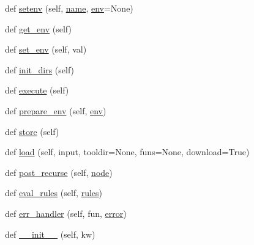 \begin{DoxyCompactItemize}
\item 
def \hyperlink{classwaflib_1_1_configure_1_1_configuration_context_a2ed4960105cdf08c13cd178367ae1818}{setenv} (self, \hyperlink{lib_2expat_8h_a1b49b495b59f9e73205b69ad1a2965b0}{name}, \hyperlink{classwaflib_1_1_configure_1_1_configuration_context_a390267f6d3529fe07447ffb4925ca533}{env}=None)
\item 
def \hyperlink{classwaflib_1_1_configure_1_1_configuration_context_a5f2dfad34690147826b09413246140f7}{get\+\_\+env} (self)
\item 
def \hyperlink{classwaflib_1_1_configure_1_1_configuration_context_ad30b269279dd9c24e6d892bb3b2fc583}{set\+\_\+env} (self, val)
\item 
def \hyperlink{classwaflib_1_1_configure_1_1_configuration_context_a782925b68e221c10f8e08433329364c9}{init\+\_\+dirs} (self)
\item 
def \hyperlink{classwaflib_1_1_configure_1_1_configuration_context_a2dadcc441cc31bb49159c709bae0ec32}{execute} (self)
\item 
def \hyperlink{classwaflib_1_1_configure_1_1_configuration_context_a913063288a6135c3105acf180e7f0f0c}{prepare\+\_\+env} (self, \hyperlink{classwaflib_1_1_configure_1_1_configuration_context_a390267f6d3529fe07447ffb4925ca533}{env})
\item 
def \hyperlink{classwaflib_1_1_configure_1_1_configuration_context_aadaed27da973f44dde6eaa890026be35}{store} (self)
\item 
def \hyperlink{classwaflib_1_1_configure_1_1_configuration_context_ae13e6fac1db3060edb50337f97b7be3f}{load} (self, input, tooldir=None, funs=None, download=True)
\item 
def \hyperlink{classwaflib_1_1_configure_1_1_configuration_context_a9620736938604c56dc26964b06a24e2e}{post\+\_\+recurse} (self, \hyperlink{structnode}{node})
\item 
def \hyperlink{classwaflib_1_1_configure_1_1_configuration_context_af1b5fdd6d958f8b996dba916c44ec9fa}{eval\+\_\+rules} (self, \hyperlink{classwaflib_1_1_configure_1_1_configuration_context_a279ad5a7c2630c4416afc36cad85a2db}{rules})
\item 
def \hyperlink{classwaflib_1_1_configure_1_1_configuration_context_acc349b079382fdac3d626eb46bd54b7e}{err\+\_\+handler} (self, fun, \hyperlink{sndfile__save_8m_ada4b423bc19e6ff5c5b514e55f518a82}{error})
\item 
def \hyperlink{classwaflib_1_1_configure_1_1_configuration_context_a0f139855aa53920d6f30a05e10253ab0}{\+\_\+\+\_\+init\+\_\+\+\_\+} (self, kw)
\item 

\end{DoxyCompactItemize}
